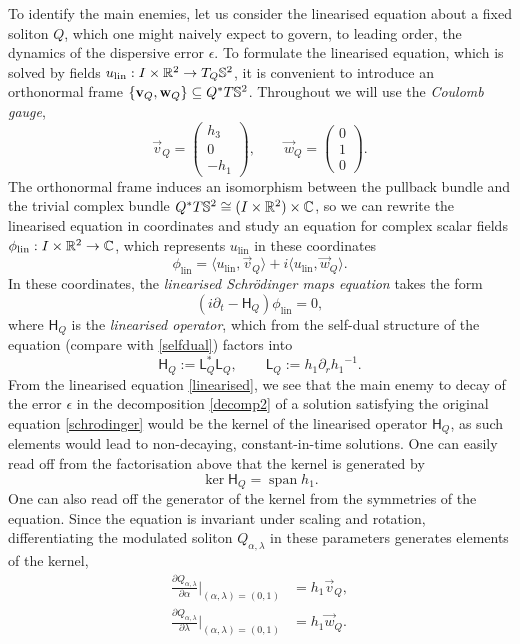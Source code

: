 To identify the main enemies, let us consider the linearised equation about a fixed soliton $Q$, which one might naively expect to govern, to leading order, the dynamics of the dispersive error $\epsilon$. To formulate the linearised equation, which is solved by fields $u_{\mathrm{lin}} : I \times \mathbb R^2 \to T_Q \mathbb S^2$, it is convenient to introduce an orthonormal frame $\{\mathbf v_Q, \mathbf w_Q\} \subseteq Q^* T\mathbb S^2$. Throughout we will use the \textit{Coulomb gauge}, 
	\[
		\vec v_Q 
			= \begin{pmatrix} h_3  \\ 0 \\ - h_1  \end{pmatrix},
		\qquad 
		\vec w_Q 
			= \begin{pmatrix} 0 \\ 1 \\ 0\end{pmatrix}.
	\]
The orthonormal frame induces an isomorphism between the pullback bundle and the trivial complex bundle $Q^* T\mathbb S^2 \cong (I \times \mathbb R^2) \times \mathbb C$, so we can rewrite the linearised equation in coordinates and study an equation for complex scalar fields $\phi_{\mathrm{lin}} : I \times \mathbb R^2 \to \mathbb C$, which represents $u_{\mathrm{lin}}$ in these coordinates
	\[
		\phi_{\mathrm{lin}} 
			= \langle u_{\mathrm{lin}}, \vec v_Q \rangle + i \langle u_{\mathrm{lin}}, \vec w_Q\rangle.
	\]
In these coordinates, the \textit{linearised Schr\"odinger maps equation} takes the form 
	\begin{equation}\label{eq:linearised}
		(i \partial_t - \mathsf{H}_Q) \phi_{\mathrm{lin}} 
			= 0,
	\end{equation}
where $\mathsf H_Q$ is the \textit{linearised operator}, which from the self-dual structure of the equation (compare with \eqref{selfdual}) factors into 
	\[
		\mathsf{H}_Q 
			:= \mathsf{L}_Q^* \mathsf{L}_Q, 
			\qquad 
		\mathsf{L}_Q 
			:= h_1 \partial_r {h_1}^{-1}.
	\]
From the linearised equation \eqref{linearised}, we see that the main enemy to decay of the error $\epsilon$ in the decomposition \eqref{decomp2} of a solution satisfying the original equation \eqref{schrodinger} would be the kernel of the linearised operator $\mathsf{H}_Q$, as such elements would lead to non-decaying, constant-in-time solutions. One can easily read off from the factorisation above that the kernel is generated by 
	\[
		\ker \mathsf{H}_Q = \operatorname{span} h_1.
	\]
One can also read off the generator of the kernel from the symmetries of the equation. Since the equation is invariant under scaling and rotation, differentiating the modulated soliton $Q_{\alpha, \lambda}$ in these parameters generates elements of the kernel,
	\begin{equation}\label{eq:generators}
		\begin{split}
		\frac{\partial Q_{\alpha, \lambda}}{\partial \alpha}\Big|_{(\alpha, \lambda) = (0, 1)}
			&= h_1 \vec v_Q,
			\\
		\frac{\partial Q_{\alpha, \lambda}}{\partial \lambda}\Big|_{(\alpha, \lambda) = (0, 1)} 
			&= h_1 
			\vec w_Q.
		\end{split}
	\end{equation}

